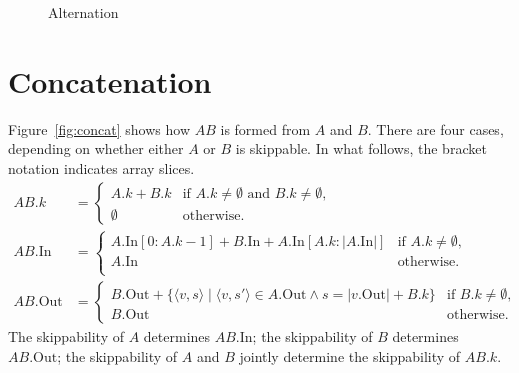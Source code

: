 \documentclass{article}
\newcommand*{\In}{\mathrm{In}}
\newcommand*{\Out}{\mathrm{Out}}
\begin{document}
\begin{figure}
{
}
\caption{Alternation\label{fig:alt}}
\end{figure}

\pagebreak
\section{Concatenation}

Figure~\ref{fig:concat} shows how $AB$ is formed from $A$ and $B$. There are four cases, depending on whether either $A$ or $B$ is skippable. In what follows, the bracket notation indicates array slices.
\begin{align*}
  AB.k &= \begin{cases}
    A.k + B.k & \text{if } A.k \ne \emptyset \text{ and } B.k \ne \emptyset,\\
    \emptyset & \text{otherwise.}
  \end{cases}
  \\
  AB.\In &= \begin{cases}
    A.\In[0:A.k-1] + B.\In + A.\In[A.k:\lvert A.\In\rvert] & \text{if } A.k \ne \emptyset,\\
    A.\In & \text{otherwise.}\\
  \end{cases}
  \\
  AB.\Out &= \begin{cases}
    B.\Out + \{\langle v,s\rangle \mid \langle v,s'\rangle \in A.\Out \wedge s = \lvert v.\Out \rvert + B.k \} & \text{if } B.k \ne \emptyset,\\
    B.\Out & \text{otherwise.}
  \end{cases}
\end{align*}
The skippability of $A$ determines $AB.\In$; the skippability of $B$ determines $AB.\Out$; the skippability of $A$ and $B$ jointly determine the skippability of $AB.k$.
\end{document}
